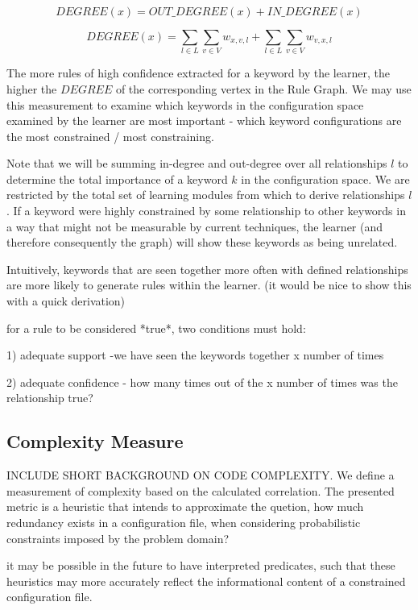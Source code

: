    $$DEGREE(x) = OUT\_DEGREE(x) + IN\_DEGREE(x)$$

    $$DEGREE(x) = \sum_{l \in L} \sum_{v \in V} w_{x, v, l} + \sum_{l \in L} \sum_{v \in V} w_{v, x, l}$$

The more rules of high confidence extracted for a keyword by the learner, 
the higher the $DEGREE$ of the corresponding vertex in the Rule Graph.
We may use this measurement to examine which keywords in the configuration
space examined by the learner are most important - which keyword configurations
are the most constrained / most constraining.

Note that we will be summing in-degree and out-degree over all
relationships $l$ to determine the total importance of
a keyword $k$ in the configuration space. We are restricted
by the total set of learning modules from which to derive
relationships $l$. If a keyword were highly constrained by some
relationship to other keywords in a way that might not be
measurable by current techniques, the learner (and therefore
consequently the graph) will show these keywords as being
unrelated.

Intuitively, keywords that are seen together more often with defined relationships are more likely to generate rules within the learner.
 (it would be nice to show this with a quick derivation)

for a rule to be considered *true*, two conditions must hold:

1) adequate support -we have seen the keywords together x number of times

2) adequate confidence - how many times out of the x number of times was the relationship true?

\iffalse
- Open Questions
> What is the difference between {\it important} rules and
  {\it rules we are more sure about}?

> Why doesn't everything just sum to zero?

\fi
\subsection{Complexity Measure}

INCLUDE SHORT BACKGROUND ON CODE COMPLEXITY. We define a measurement
of complexity based on the calculated correlation. The presented
metric is a heuristic that intends to approximate the quetion, 
 how much redundancy exists in a configuration file, when considering
probabilistic constraints imposed by the problem domain?

it may be possible in the future to have interpreted predicates,
such that these heuristics may more accurately reflect the informational
content of a constrained configuration file.




